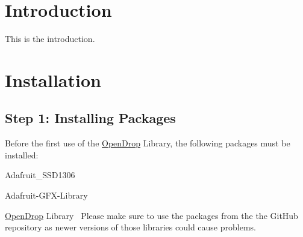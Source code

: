 \hypertarget{index_intro_sec}{}\section{Introduction}\label{index_intro_sec}


This is the introduction.\hypertarget{index_install_sec}{}\section{Installation}\label{index_install_sec}
\hypertarget{index_step1}{}\subsection{Step 1\+: Installing Packages}\label{index_step1}
Before the first use of the \mbox{\hyperlink{class_open_drop}{Open\+Drop}} Library, the following packages must be installed\+:~\newline

\begin{DoxyItemize}
\item Adafruit\+\_\+\+S\+S\+D1306~\newline

\item Adafruit-\/\+G\+F\+X-\/\+Library~\newline

\item \mbox{\hyperlink{class_open_drop}{Open\+Drop}} Library~\newline
Please make sure to use the packages from the the Git\+Hub repository as newer versions of those libraries could cause problems. 
\end{DoxyItemize}